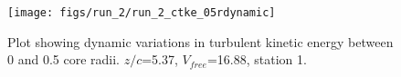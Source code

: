 \begin{figure}[H]
\centering
\texttt{[image: figs/run\_2/run\_2\_ctke\_05rdynamic]}
\caption{Plot showing dynamic variations in turbulent kinetic energy between 0 and 0.5 core radii. $z/c$=5.37, $V_{free}$=16.88, station 1.}
\label{fig:run_2_ctke_05rdynamic}
\end{figure}


